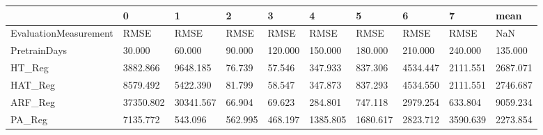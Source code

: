 \begin{tabular}{llllllllll}
\toprule
{} &         0 &         1 &       2 &       3 &        4 &        5 &        6 &        7 &     mean \\
\midrule
EvaluationMeasurement &      RMSE &      RMSE &    RMSE &    RMSE &     RMSE &     RMSE &     RMSE &     RMSE &      NaN \\
PretrainDays          &    30.000 &    60.000 &  90.000 & 120.000 &  150.000 &  180.000 &  210.000 &  240.000 &  135.000 \\
HT\_Reg                &  3882.866 &  9648.185 &  76.739 &  57.546 &  347.933 &  837.306 & 4534.447 & 2111.551 & 2687.071 \\
HAT\_Reg               &  8579.492 &  5422.390 &  81.799 &  58.547 &  347.873 &  837.293 & 4534.550 & 2111.551 & 2746.687 \\
ARF\_Reg               & 37350.802 & 30341.567 &  66.904 &  69.623 &  284.801 &  747.118 & 2979.254 &  633.804 & 9059.234 \\
PA\_Reg                &  7135.772 &   543.096 & 562.995 & 468.197 & 1385.805 & 1680.617 & 2823.712 & 3590.639 & 2273.854 \\
\bottomrule
\end{tabular}
